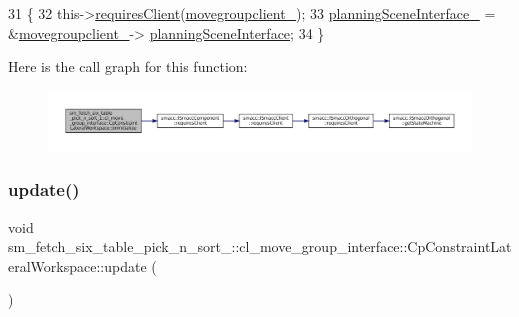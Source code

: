 \begin{DoxyCode}
31         \{
32             this->\hyperlink{classsmacc_1_1ISmaccComponent_a36c085d906fbae0fcaee817aaeafebf4}{requiresClient}(\hyperlink{classsm__fetch__six__table__pick__n__sort__1_1_1cl__move__group__interface_1_1CpConstraintLateralWorkspace_a03b069a8b7cbf372cbe63a36f8ae3b4f}{movegroupclient\_});
33             \hyperlink{classsm__fetch__six__table__pick__n__sort__1_1_1cl__move__group__interface_1_1CpConstraintLateralWorkspace_aa35cde8d74f5d015e7a6384c2bbd1a16}{planningSceneInterface\_} = &\hyperlink{classsm__fetch__six__table__pick__n__sort__1_1_1cl__move__group__interface_1_1CpConstraintLateralWorkspace_a03b069a8b7cbf372cbe63a36f8ae3b4f}{movegroupclient\_}->
      \hyperlink{classcl__move__group__interface_1_1ClMoveGroup_a11bfab580f36e2ad32c9b37d6f58f44c}{planningSceneInterface};
34         \}
\end{DoxyCode}
Here is the call graph for this function\+:
\nopagebreak
\begin{figure}[H]
\begin{center}
\leavevmode
\includegraphics[width=350pt]{classsm__fetch__six__table__pick__n__sort__1_1_1cl__move__group__interface_1_1CpConstraintLateralWorkspace_ab6a7532f9f5c0a52eb149177dcadfeb2_cgraph}
\end{center}
\end{figure}
\mbox{\label{classsm__fetch__six__table__pick__n__sort__1_1_1cl__move__group__interface_1_1CpConstraintLateralWorkspace_ac2b93d99ca5fb46aabfa98040124b272}} 
\subsubsection{\texorpdfstring{update()}{update()}}
{\footnotesize\ttfamily void sm\+\_\+fetch\+\_\+six\+\_\+table\+\_\+pick\+\_\+n\+\_\+sort\+\_\+::cl\+\_\+move\+\_\+group\+\_\+interface\+::\+Cp\+Constraint\+Lateral\+Workspace\+::update (\begin{DoxyParamCaption}{ }\end{DoxyParamCaption})\hspace{0.3cm}{\ttfamily [virtual]}}



